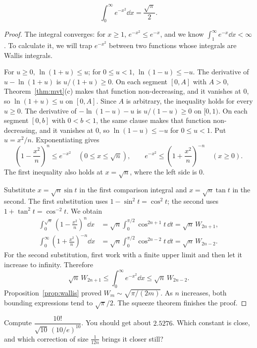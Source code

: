 \begin{proposition}\label{prop:gaussianintegral}
\[
\int_0^\infty e^{-x^2}\dd x=\frac{\sqrt\pi}{2}.
\]
\end{proposition}
\begin{proof}
The integral converges: for $x\ge1$, $e^{-x^2}\le e^{-x}$, and we know $\int_1^\infty e^{-x}\dd x<\infty$. To calculate it, we will trap $e^{-x^2}$ between two functions whose integrals are Wallis integrals.

For $u\ge0$, $\ln(1+u)\le u$; for $0\le u<1$, $\ln(1-u)\le-u$. The derivative of $u-\ln(1+u)$ is $u/(1+u)\ge0$. On each segment $[0,A]$ with $A>0$, Theorem~\ref{thm:mvt}(c) makes that function non-decreasing, and it vanishes at $0$, so $\ln(1+u)\le u$ on $[0,A]$. Since $A$ is arbitrary, the inequality holds for every $u\ge0$. The derivative of $-\ln(1-u)-u$ is $u/(1-u)\ge0$ on $[0,1)$. On each segment $[0,b]$ with $0<b<1$, the same clause makes that function non-decreasing, and it vanishes at $0$, so $\ln(1-u)\le-u$ for $0\le u<1$. Put $u=x^2/n$. Exponentiating gives
\[
\left(1-\frac{x^2}{n}\right)^n\le e^{-x^2}
\quad(0\le x\le\sqrt n),\qquad
e^{-x^2}\le\left(1+\frac{x^2}{n}\right)^{-n}
\quad(x\ge0).
\]
The first inequality also holds at $x=\sqrt n$, where the left side is $0$.

Substitute $x=\sqrt n\sin t$ in the first comparison integral and $x=\sqrt n\tan t$ in the second. The first substitution uses $1-\sin^2t=\cos^2t$; the second uses $1+\tan^2t=\cos^{-2}t$. We obtain
\[
\begin{aligned}
\int_0^{\sqrt n}\left(1-\frac{x^2}{n}\right)^n\dd x
&=\sqrt n\int_0^{\pi/2}\cos^{2n+1}t\,\dd t
=\sqrt n\,W_{2n+1},\\
\int_0^\infty\left(1+\frac{x^2}{n}\right)^{-n}\dd x
&=\sqrt n\int_0^{\pi/2}\cos^{2n-2}t\,\dd t
=\sqrt n\,W_{2n-2}.
\end{aligned}
\]
For the second substitution, first work with a finite upper limit and then let it increase to infinity. Therefore
\[
\sqrt n\,W_{2n+1}
\le\int_0^\infty e^{-x^2}\dd x
\le\sqrt n\,W_{2n-2}.
\]
Proposition~\ref{prop:wallis} proved $W_m\sim\sqrt{\pi/(2m)}$. As $n$ increases, both bounding expressions tend to $\sqrt\pi/2$. The squeeze theorem finishes the proof.
\end{proof}

\begin{think}
Compute $\dfrac{10!}{\sqrt{10}\,(10/e)^{10}}$. You should get about $2.5276$. Which constant is close, and which correction of size $\frac1{12n}$ brings it closer still?
\end{think}

